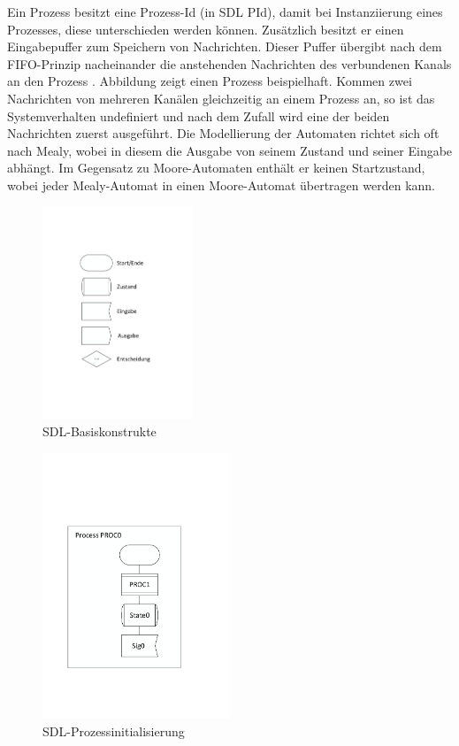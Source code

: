 Ein Prozess besitzt eine Prozess-Id (in \ac{SDL} PId), damit bei Instanziierung eines Prozesses, diese unterschieden werden können. Zusätzlich besitzt er einen Eingabepuffer zum Speichern von Nachrichten. Dieser Puffer übergibt nach dem \ac{FIFO}-Prinzip nacheinander die anstehenden Nachrichten des verbundenen Kanals an den Prozess \cite[42]{ITUT101_2016}. Abbildung \pageref{fig:ProcessInit} zeigt einen Prozess beispielhaft. Kommen zwei Nachrichten von mehreren Kanälen gleichzeitig an einem Prozess an, so ist das Systemverhalten undefiniert und nach dem Zufall wird eine der beiden Nachrichten zuerst ausgeführt.
Die Modellierung der Automaten richtet sich oft nach Mealy, wobei in diesem die Ausgabe von seinem Zustand und seiner Eingabe abhängt.
Im Gegensatz zu Moore-Automaten enthält er keinen Startzustand, wobei jeder Mealy-Automat in einen Moore-Automat übertragen werden kann.
\pagebreak


\begin{figure}[ht]
	\centering
	\includegraphics[width=0.4\textwidth]{Graphics/Basiskonstrukte.pdf}
	\caption{SDL-Basiskonstrukte}
	\label{fig:Basiskonstrukte}
\end{figure}

\begin{figure}[h]
	\centering
	\includegraphics[width=0.5\textwidth]{Graphics/ProcessInit.pdf}
	\caption{SDL-Prozessinitialisierung}
	\label{fig:ProcessInit}
\end{figure}


